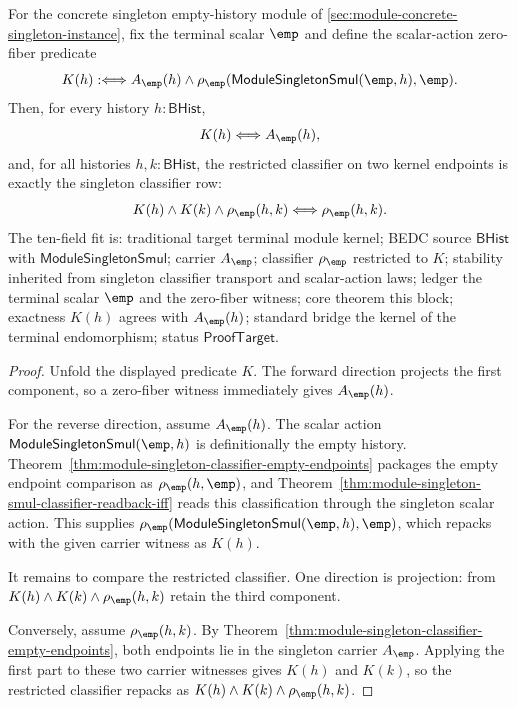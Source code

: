 \begin{theorem}
\label{thm:module-singleton-smul-kernel-exactness}
For the concrete singleton empty-history module of
\autoref{sec:module-concrete-singleton-instance}, fix the terminal scalar
$\emp$ and define the scalar-action zero-fiber predicate
$$
K(h):\Longleftrightarrow A_{\emp}(h)\land
\rho_{\emp}(\mathsf{ModuleSingletonSmul}(\emp,h),\emp).
$$
Then, for every history $h:\mathsf{BHist}$,
$$
K(h)\Longleftrightarrow A_{\emp}(h),
$$
and, for all histories $h,k:\mathsf{BHist}$, the restricted classifier on two
kernel endpoints is exactly the singleton classifier row:
$$
K(h)\land K(k)\land \rho_{\emp}(h,k)\Longleftrightarrow\rho_{\emp}(h,k).
$$
The ten-field fit is: traditional target terminal module kernel; BEDC source
$\mathsf{BHist}$ with $\mathsf{ModuleSingletonSmul}$; carrier $A_{\emp}$;
classifier $\rho_{\emp}$ restricted to $K$; stability inherited from singleton
classifier transport and scalar-action laws; ledger the terminal scalar
$\emp$ and the zero-fiber witness; core theorem this block; exactness
$K(h)$ agrees with $A_{\emp}(h)$; standard bridge the kernel of the terminal
endomorphism; status $\mathsf{ProofTarget}$.
\end{theorem}
\begin{proof}
Unfold the displayed predicate $K$. The forward direction projects the first
component, so a zero-fiber witness immediately gives $A_{\emp}(h)$.

For the reverse direction, assume $A_{\emp}(h)$. The scalar action
$\mathsf{ModuleSingletonSmul}(\emp,h)$ is definitionally the empty history.
Theorem~\ref{thm:module-singleton-classifier-empty-endpoints} packages the
empty endpoint comparison as $\rho_{\emp}(h,\emp)$, and
Theorem~\ref{thm:module-singleton-smul-classifier-readback-iff} reads this
classification through the singleton scalar action. This supplies
$\rho_{\emp}(\mathsf{ModuleSingletonSmul}(\emp,h),\emp)$, which repacks with
the given carrier witness as $K(h)$.

It remains to compare the restricted classifier. One direction is projection:
from $K(h)\land K(k)\land \rho_{\emp}(h,k)$ retain the third component.

Conversely, assume $\rho_{\emp}(h,k)$. By
Theorem~\ref{thm:module-singleton-classifier-empty-endpoints}, both endpoints
lie in the singleton carrier $A_{\emp}$. Applying the first part to these two
carrier witnesses gives $K(h)$ and $K(k)$, so the restricted classifier repacks
as $K(h)\land K(k)\land \rho_{\emp}(h,k)$.
\end{proof}

